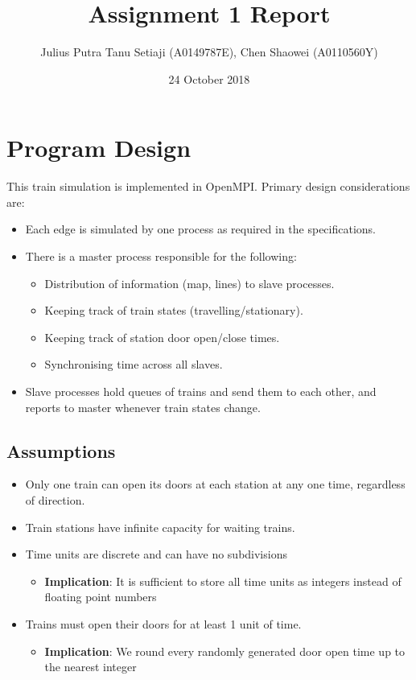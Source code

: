 \documentclass[a4paper,12pt]{article}
\title{Assignment 1 Report}
\author{Julius Putra Tanu Setiaji (A0149787E), Chen Shaowei (A0110560Y)}
\date{24 October 2018}
\begin{document}
\maketitle

\section{Program Design}
This train simulation is implemented in OpenMPI. Primary design considerations are:
\begin{itemize}
	\item Each edge is simulated by one process as required in the specifications.
	\item There is a master process responsible for the following:
	      \begin{itemize}
		      \item Distribution of information (map, lines) to slave processes.
		      \item Keeping track of train states (travelling/stationary).
		      \item Keeping track of station door open/close times.
		      \item Synchronising time across all slaves.
	      \end{itemize}
	\item Slave processes hold queues of trains and send them to each other, and reports to master whenever train states change.
\end{itemize}

\subsection*{Assumptions}

\begin{itemize}
	\item Only one train can open its doors at each station at any one time, regardless of direction.
	\item Train stations have infinite capacity for waiting trains.
	\item Time units are discrete and can have no subdivisions
	      \begin{itemize}
		      \item \textbf{Implication}: It is sufficient to store all time units as integers instead of floating point numbers
	      \end{itemize}
	\item Trains must open their doors for at least 1 unit of time.
	      \begin{itemize}
		      \item \textbf{Implication}: We round every randomly generated door open time up to the nearest integer
	      \end{itemize}
\end{itemize}
\end{document}
